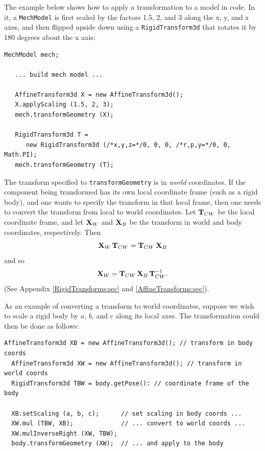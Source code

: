 The example below shows how to apply a transformation to a model in
code. In it, a {\tt MechModel} is first scaled by the factors 1.5, 2,
and 3 along the x, y, and z axes, and then flipped upside down using a
{\tt RigidTransform3d} that rotates it by 180 degrees about the x
axis:
%
\begin{lstlisting}[]
   MechModel mech;

   ... build mech model ...

   AffineTransform3d X = new AffineTransform3d();
   X.applyScaling (1.5, 2, 3);
   mech.transformGeometry (X);
   
   RigidTransform3d T = 
      new RigidTransform3d (/*x,y,z=*/0, 0, 0, /*r,p,y=*/0, 0, Math.PI);
   mech.transformGeometry (T);
\end{lstlisting}
%

\begin{sideblock}
The transform specified to {\tt transformGeometry} is in {\it world}
coordinates. If the component being transformed has its own
local coordinate frame (such as a rigid body), and one wants to
specify the transform in that local frame, then one needs to convert
the transform from local to world coordinates. Let ${\bf T}_{CW}$ be the
local coordinate frame, and let ${\bf X}_W$ and ${\bf X}_B$ be the transform in
world and body coordinates, respectively. Then
%
\begin{equation*}
{\bf X}_W \, {\bf T}_{CW} = {\bf T}_{CW} \, {\bf X}_B
\end{equation*}
%
and so
%
\begin{equation*}
{\bf X}_W  = {\bf T}_{CW} \, {\bf X}_B \, {\bf T}_{CW}^{-1}.
\end{equation*}
%
(See Appendix \ref{RigidTransforms:sec}
and \ref{AffineTransforms:sec}).  
\end{sideblock}

As an example of converting a transform to world coordinates, suppose
we wish to scale a rigid body by $a$, $b$, and $c$ along its local
axes. The transformation could then be done as follows:
%
\begin{lstlisting}[]
  AffineTransform3d XB = new AffineTransform3d(); // transform in body coords
  AffineTransform3d XW = new AffineTransform3d(); // transform in world coords
  RigidTransform3d TBW = body.getPose(): // coordinate frame of the body

  XB.setScaling (a, b, c);      // set scaling in body coords ...
  XW.mul (TBW, XB);             // ... convert to world coords ...
  XW.mulInverseRight (XW, TBW); 
  body.transformGeometry (XW);  // ... and apply to the body
\end{lstlisting}
%

